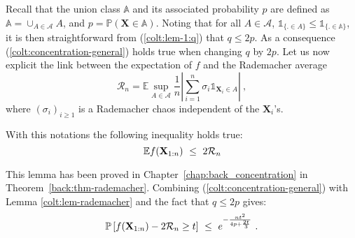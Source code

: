 Recall that the union class $\mathbb{A}$ and its associated probability $p$ are defined as $\mathbb{A} = \cup_{A \in \mathcal{A}} A$, and $p = \mathbb{P}(\mathbf{X} \in \mathbb{A})$. Noting that for all $A \in \mathcal{A}$, $\mathds{1}_{\{ . \in A\}} \le \mathds{1}_{\{ . \in \mathbb{A}\}}$, it is then straightforward from (\ref{colt:lem-1:q}) that $q \le 2p$. As a consequence (\ref{colt:concentration-general})  holds true when changing $q$ by $2p$.
Let us now explicit the link between the expectation of $f$ and the Rademacher average $$\mathcal{R}_n = \mathbb{E} \sup_{A \in \mathcal{A}} \frac{1}{n} \left | \sum_{i=1}^{n} \sigma_i \mathds{1}_{\mathbf{X}_i \in A}\right|~,$$ where $(\sigma_i)_{i \ge 1}$ is a Rademacher chaos independent of the $\mathbf{X}_i$'s.
\begin{lemma}
\label{colt:lem-rademacher}
 With this notations the following inequality holds true:
$$ \mathbb{E}f(\mathbf X_{1:n}) ~\le~ 2 \mathcal{R}_n$$
\end{lemma}
This lemma has been proved in Chapter~\ref{chap:back_concentration} in Theorem~\ref{back:thm-rademacher}.
Combining (\ref{colt:concentration-general}) with Lemma \ref{colt:lem-rademacher} and the fact that $q \le 2p$ gives:
\begin{align}
\label{colt:vc1}
\mathbb{P}\left [ f(\mathbf X_{1:n}) - 2 \mathcal{R}_n \ge t \right] ~\le~ e^{-\frac{n t^2}{4p + \frac{2t}{3}} }~.
\end{align}



